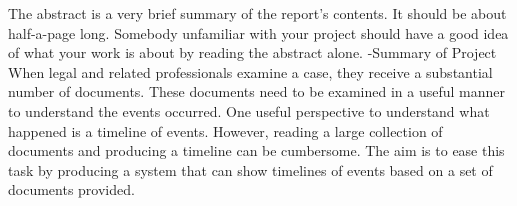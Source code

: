 The abstract is a very brief summary of the report's contents. It should be about half-a-page long. Somebody unfamiliar with your project should have a good idea of what your work is about by reading the abstract alone.
-Summary of Project
When legal and related professionals examine a case, they receive a substantial number of documents. These documents need to be examined in a useful manner to understand the events occurred. One useful perspective to understand what happened is a timeline of events. However, reading a large collection of documents and producing a timeline can be cumbersome. The aim is to ease this task by producing a system that can show timelines of events based on a set of documents provided.